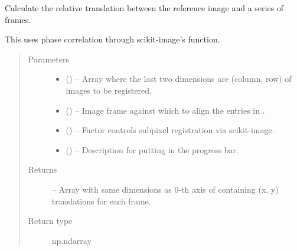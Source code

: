 \documentclass[letterpaper,10pt,english]{sphinxmanual}
\begin{document}

\begin{fulllineitems}
\label{\detokenize{xanespy:xanespy.xanes_math.register_correlations}}
Calculate the relative translation between the reference image and
a series of frames.

This uses phase correlation through scikit-image's
 function.
\begin{quote}\begin{description}
\item[{Parameters}] \leavevmode\begin{itemize}
\item {} 
 () -- Array where the last two dimensions are (column, row) of images
to be registered.

\item {} 
 () -- Image frame against which to align the entries in .

\item {} 
 (\sphinxstyleliteralemphasis{, }) -- Factor controls subpixel registration via scikit-image.

\item {} 
 (\sphinxstyleliteralemphasis{, }) -- Description for putting in the progress bar.

\end{itemize}

\item[{Returns}] \leavevmode
{} -- Array with same dimensions as 0-th axis of  containing
(x, y) translations for each frame.

\item[{Return type}] \leavevmode
np.ndarray

\end{description}\end{quote}

\end{fulllineitems}
\end{document}
